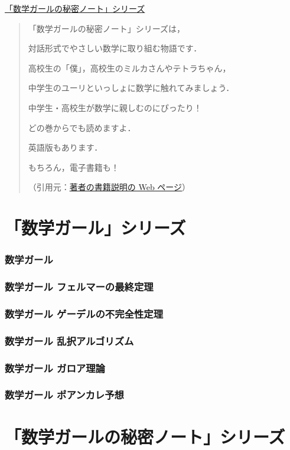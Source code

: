 \documentclass[a4j,uplatex,11pt]{jsarticle}
\newcommand{\linedhref}[2]{\underline{\href{#1}{#2}}}
\begin{document}
\underline{「数学ガールの秘密ノート」シリーズ}

\begin{quotation}
	「数学ガールの秘密ノート」シリーズは，

	対話形式でやさしい数学に取り組む物語です．

	高校生の「僕」，高校生のミルカさんやテトラちゃん，

	中学生のユーリといっしょに数学に触れてみましょう．

	中学生・高校生が数学に親しむのにぴったり！

	どの巻からでも読めますよ．

	英語版もあります．

	もちろん，電子書籍も！

	（引用元：\linedhref{https://www.hyuki.com/girl/}{著者の書籍説明の Web ページ}）
\end{quotation}

\part{「数学ガール」シリーズ}

\section{数学ガール}
\section{数学ガール フェルマーの最終定理}
\section{数学ガール ゲーデルの不完全性定理}
\section{数学ガール 乱択アルゴリズム}
\section{数学ガール ガロア理論}
\section{数学ガール ポアンカレ予想}

\newpage

\part{「数学ガールの秘密ノート」シリーズ}
\end{document}
